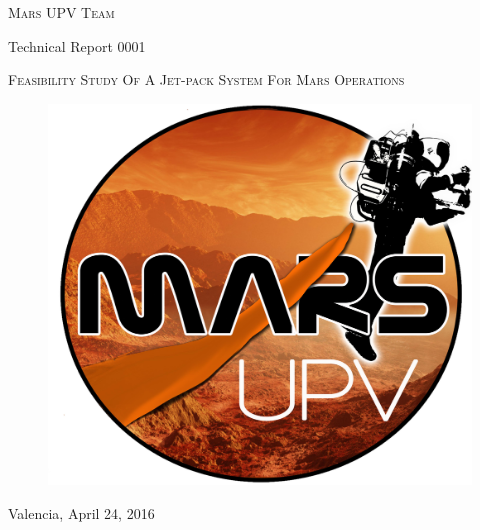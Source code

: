 \documentclass[twocolumn]{article}
\begin{document}
\begin{titlepage}

  \vspace{5cm}

  \begin{center}
    {\Huge
    \textsc{Mars UPV Team}}
    
    \vspace{1cm}
    {\LARGE Technical Report 0001}
  \end{center}
 
  \vspace{0.5cm}
 
  \begin{center}
    \LARGE
    \textsc{Feasibility Study Of A Jet-pack System For Mars Operations}
  \end{center}

 
  \vspace{\fill}
  
  \begin{figure}[H]
    \centering
    \includegraphics[width=12cm]{img/Logo_Mars_UPV_A3}
  \end{figure}

  \vspace{\fill}

  \begin{center}
     \Large Valencia, April 24, 2016
  \end{center}
  
  \vspace{1cm}
  
\end{titlepage}
\end{document}
